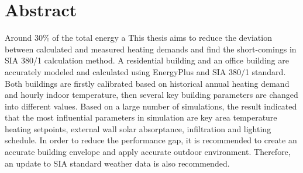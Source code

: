 




 \setcounter{tocdepth}{2}
 \tableofcontents

 \cleardoublepage


\chapter*{Abstract}
    Around 30\% of the total energy a
    This thesis aims to reduce the deviation between calculated and measured heating demands and find the short-comings in SIA 380/1 calculation method. A residential building and an office building are accurately modeled and calculated using EnergyPlus and SIA 380/1 standard. Both buildings are firstly calibrated based on historical annual heating demand and hourly indoor temperature, then several key building parameters are changed into different values. Based on a large number of simulations, the result indicated that the most influential parameters in simulation are key area temperature heating setpoints, external wall solar absorptance, infiltration and lighting schedule. In order to reduce the performance gap, it is recommended to create an accurate building envelope and apply accurate outdoor environment. Therefore, an update to SIA standard weather data is also recommended.


 \cleardoublepage
